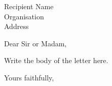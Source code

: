 \documentclass[11pt]{letter}
\begin{document}
\begin{letter}{Recipient Name\\Organisation\\Address}
\opening{Dear Sir or Madam,}

Write the body of the letter here.

\closing{Yours faithfully,}
\end{letter}
\end{document}

